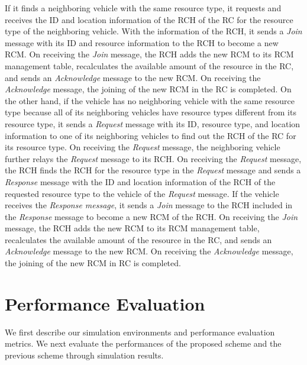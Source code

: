 \documentclass[sensors,article,accept,moreauthors,pdftex]{Definitions/mdpi}
\begin{document}
If it finds a neighboring vehicle with the same resource type, it requests and receives the ID and location information of the RCH of the RC for the resource type of the neighboring vehicle.
With the information of the RCH, it sends a \textit{Join} message with its ID and resource information to the RCH to become a new RCM.
On receiving the \textit{Join} message, the RCH adds the new RCM to its RCM management table, recalculates the available amount of the resource in the RC, and sends an \textit{Acknowledge} message to the new RCM.
On receiving the \textit{Acknowledge} message, the joining of the new RCM in the RC is completed.
On the other hand, if the vehicle has no neighboring vehicle with the same resource type because all of its neighboring vehicles have resource types different from its resource type, it sends a \textit{Request} message with its ID, resource type, and location information to one of its neighboring vehicles to find out the RCH of the RC for its resource type.
On receiving the \textit{Request} message, the neighboring vehicle further relays the \textit{Request} message to its RCH.
On receiving the \textit{Request} message, the RCH finds the RCH for the resource type in the \textit{Request} message and sends a \textit{Response} message with the ID and location information of the RCH of the requested resource type to the vehicle of the \textit{Request} message.
If the vehicle receives the \textit{Response message}, it sends a \textit{Join} message to the RCH included in the \textit{Response} message to become a new RCM of the RCH.
On receiving the \textit{Join} message, the RCH adds the new RCM to its RCM management table, recalculates the available amount of the resource in the RC, and sends an \textit{Acknowledge} message to the new RCM.
On receiving the \textit{Acknowledge} message, the joining of the new RCM in RC is completed.

\section{Performance Evaluation} \label{sec.s}
 We first describe our simulation environments and performance evaluation metrics. We next evaluate the performances of the proposed scheme and the previous scheme through simulation results.
\end{document}
